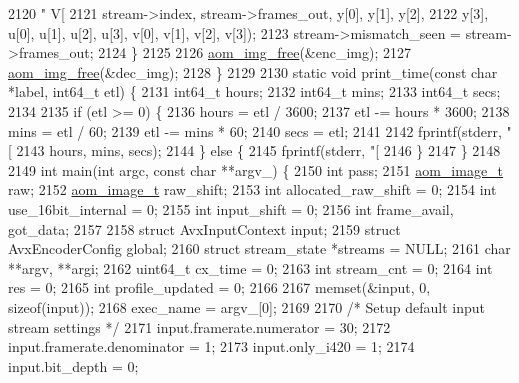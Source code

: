 \begin{DoxyCodeInclude}
{{{{{{{{{{{{{{{{{{{{{{{{{{{{{{{{{{{{{{{{{{{{{{{{2120                           \textcolor{stringliteral}{" V[%
2121                           stream->index, stream->frames\_out, y[0], y[1], y[2],
2122                           y[3], u[0], u[1], u[2], u[3], v[0], v[1], v[2], v[3]);
2123     stream->mismatch\_seen = stream->frames\_out;
2124   \}
2125 
2126   \hyperlink{aom__image_8h_afff22f7f3eb9409c5b678d1962f110a8}{aom\_img\_free}(&enc\_img);
2127   \hyperlink{aom__image_8h_afff22f7f3eb9409c5b678d1962f110a8}{aom\_img\_free}(&dec\_img);
2128 \}
2129 
2130 \textcolor{keyword}{static} \textcolor{keywordtype}{void} print\_time(\textcolor{keyword}{const} \textcolor{keywordtype}{char} *label, int64\_t etl) \{
2131   int64\_t hours;
2132   int64\_t mins;
2133   int64\_t secs;
2134 
2135   \textcolor{keywordflow}{if} (etl >= 0) \{
2136     hours = etl / 3600;
2137     etl -= hours * 3600;
2138     mins = etl / 60;
2139     etl -= mins * 60;
2140     secs = etl;
2141 
2142     fprintf(stderr, \textcolor{stringliteral}{"[%
2143             hours, mins, secs);
2144   \} \textcolor{keywordflow}{else} \{
2145     fprintf(stderr, \textcolor{stringliteral}{"[%
2146   \}
2147 \}
2148 
2149 \textcolor{keywordtype}{int} main(\textcolor{keywordtype}{int} argc, \textcolor{keyword}{const} \textcolor{keywordtype}{char} **argv\_) \{
2150   \textcolor{keywordtype}{int} pass;
2151   \hyperlink{structaom__image}{aom\_image\_t} raw;
2152   \hyperlink{structaom__image}{aom\_image\_t} raw\_shift;
2153   \textcolor{keywordtype}{int} allocated\_raw\_shift = 0;
2154   \textcolor{keywordtype}{int} use\_16bit\_internal = 0;
2155   \textcolor{keywordtype}{int} input\_shift = 0;
2156   \textcolor{keywordtype}{int} frame\_avail, got\_data;
2157 
2158   \textcolor{keyword}{struct }AvxInputContext input;
2159   \textcolor{keyword}{struct }AvxEncoderConfig global;
2160   \textcolor{keyword}{struct }stream\_state *streams = NULL;
2161   \textcolor{keywordtype}{char} **argv, **argi;
2162   uint64\_t cx\_time = 0;
2163   \textcolor{keywordtype}{int} stream\_cnt = 0;
2164   \textcolor{keywordtype}{int} res = 0;
2165   \textcolor{keywordtype}{int} profile\_updated = 0;
2166 
2167   memset(&input, 0, \textcolor{keyword}{sizeof}(input));
2168   exec\_name = argv\_[0];
2169 
2170   \textcolor{comment}{/* Setup default input stream settings */}
2171   input.framerate.numerator = 30;
2172   input.framerate.denominator = 1;
2173   input.only\_i420 = 1;
2174   input.bit\_depth = 0;
}}}}}}}}}}}}}}}}}}}}}}}}}}}}}}}}}}}}}}}}}}}}}}}}}}}
\end{DoxyCodeInclude}
